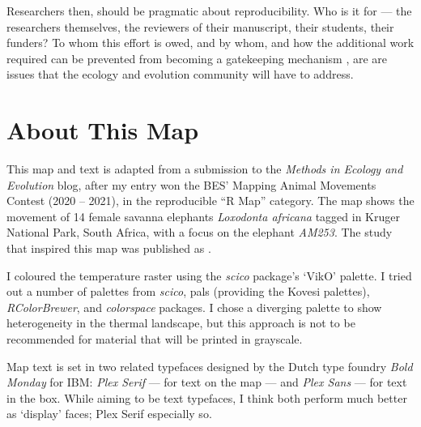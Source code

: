 \begin{description}
			Researchers then, should be pragmatic about reproducibility. Who is it for — the researchers themselves, the reviewers of their manuscript, their students, their funders?
			To whom this effort is owed, and by whom, and how the additional work required can be prevented from becoming a gatekeeping mechanism \citep{finley,murphy2020}, are are issues that the ecology and evolution community will have to address.
		\end{description}

	{ \begin{center}  \end{center} }

	\section*{About This Map}

	This map and text is adapted from a submission to the \textit{Methods in Ecology and Evolution} blog, after my entry won the BES' Mapping Animal Movements Contest (2020 -- 2021), in the reproducible ``R Map'' category. The map shows the movement of 14 female savanna elephants \textit{Loxodonta africana} tagged in Kruger National Park, South Africa, with a focus on the elephant \emph{AM253}.
	The study that inspired this map was published as \citet{thaker2019} .

	I coloured the temperature raster using the \textit{scico} package's `VikO' palette. I tried out a number of palettes from \textit{scico}, pals (providing the Kovesi palettes), \textit{RColorBrewer}, and \textit{colorspace} packages. I chose a diverging palette to show heterogeneity in the thermal landscape, but this approach is not to be recommended for material that will be printed in grayscale.

	Map text is set in two related typefaces designed by the Dutch type foundry \emph{Bold Monday} for IBM: \emph{Plex Serif} --- for text on the map --- and \emph{Plex Sans} --- for text in the box.
	While aiming to be text typefaces, I think both perform much better as `display' faces; Plex Serif especially so.

	{ \begin{center}  \end{center} }

	

	\endgroup
	
\afterpage{\nopagecolor}
\pagestyle{scrheadings}
